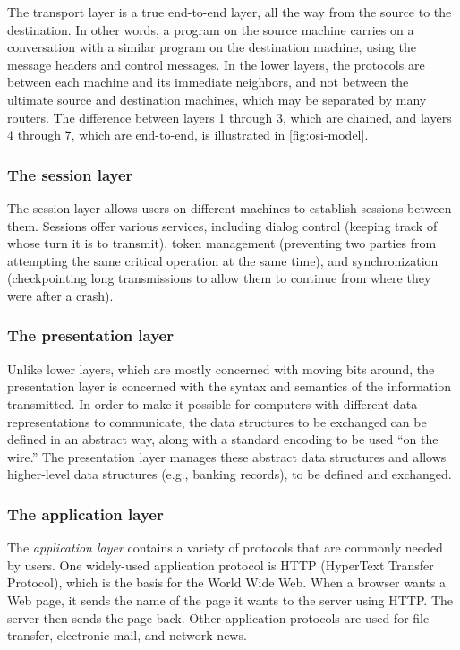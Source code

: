 \documentclass[b5paper,11pt]{memoir}
\begin{document}
The transport layer is a true end-to-end layer, all the way from the
source to the destination. In other words, a program on the source
machine carries on a conversation with a similar program on the
destination machine, using the message headers and control messages. In
the lower layers, the protocols are between each machine and its
immediate neighbors, and not between the ultimate source and destination
machines, which may be separated by many routers. The difference between
layers 1 through 3, which are chained, and layers 4 through 7, which are
end-to-end, is illustrated in \vref{fig:osi-model}.


\subsubsection{The session layer}

The session layer allows users on different machines to establish
{sessions} between them. Sessions offer various services, including
{dialog control} (keeping track of whose turn it is to transmit), {token
management} (preventing two parties from attempting the same critical
operation at the same time), and {synchronization} (checkpointing long
transmissions to allow them to continue from where they were after a
crash).


\subsubsection{The presentation layer}

Unlike lower layers, which are mostly concerned with moving bits around,
the {presentation layer} is concerned with the syntax and semantics of
the information transmitted. In order to make it possible for computers
with different data representations to communicate, the data structures
to be exchanged can be defined in an abstract way, along with a standard
encoding to be used ``on the wire.''
The presentation layer manages these abstract data structures and allows higher-level data structures (e.g., banking records), to be defined and exchanged.


\subsubsection{The application layer}

The \emph{application layer} contains a variety of protocols that are
commonly needed by users. One widely-used application protocol is {HTTP}
({HyperText Transfer Protocol}), which is the basis for the World Wide
Web. When a browser wants a Web page, it sends the name of the page it
wants to the server using HTTP. The server then sends the page back.
Other application protocols are used for file transfer, electronic mail,
and network news.
\end{document}
